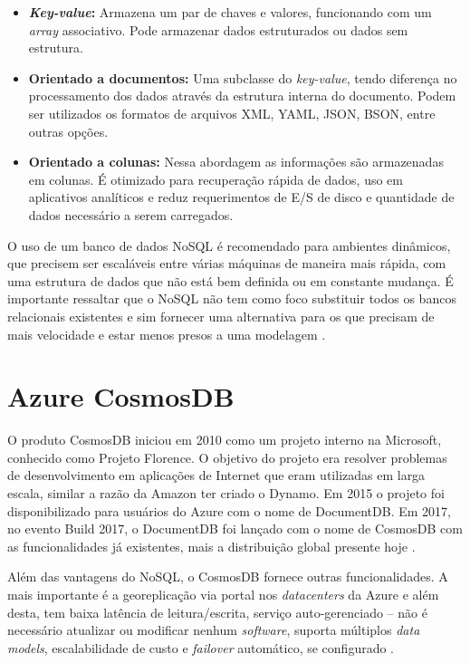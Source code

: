 \documentclass[12pt]{article}
\begin{document}
\begin{itemize}
	\item \textbf{\textit{Key-value}:} Armazena um par de chaves e valores, funcionando com um \textit{array} associativo. Pode armazenar dados estruturados ou dados sem estrutura.
	\item \textbf{Orientado a documentos:} Uma subclasse do \textit{key-value}, tendo diferença no processamento dos dados através da estrutura interna do documento. Podem ser utilizados 
	os formatos de arquivos XML, YAML, JSON, BSON, entre outras opções.
	\item \textbf{Orientado a colunas:} Nessa abordagem as informações são armazenadas em colunas. É otimizado para recuperação rápida de dados, uso em aplicativos 
	analíticos e reduz requerimentos de E/S de disco e quantidade de dados necessário a serem carregados.
\end{itemize}

O uso de um banco de dados NoSQL é recomendado para ambientes dinâmicos, que precisem ser escaláveis entre várias máquinas de maneira mais rápida, com uma estrutura de dados que não está bem 
definida ou em constante mudança. É importante ressaltar que o NoSQL não tem como foco substituir todos os bancos relacionais existentes e sim fornecer uma alternativa para os que 
precisam de mais velocidade e estar menos presos a uma modelagem \cite{Oliveira2011} \cite{Lith2010} \cite{Leavitt2010}. 

\section{Azure CosmosDB}
O produto CosmosDB iniciou em 2010 como um projeto interno na Microsoft, conhecido como Projeto Florence. O objetivo do projeto era resolver problemas de desenvolvimento em aplicações de Internet
que eram utilizadas em larga escala, similar a razão da Amazon ter criado o Dynamo. Em 2015 o projeto foi disponibilizado para usuários do Azure com o nome de DocumentDB. Em 2017, no evento Build 2017,
o DocumentDB foi lançado com o nome de CosmosDB com as funcionalidades já existentes, mais a distribuição global presente hoje \cite{Paz2018}.

Além das vantagens do NoSQL, o CosmosDB fornece outras funcionalidades. A mais importante é a georeplicação via portal nos \textit{datacenters} da Azure e além desta, tem baixa latência de leitura/escrita,
serviço auto-gerenciado -- não é necessário atualizar ou modificar nenhum \textit{software}, suporta múltiplos \textit{data models}, escalabilidade de custo e \textit{failover} automático, se configurado \cite{Paz2018} \cite{Shukla2015}.
\end{document}
